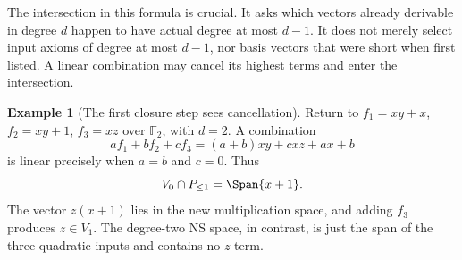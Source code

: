 \documentclass[11pt,a4paper,oneside,openany]{book}
\theoremstyle{definition}\newtheorem{definition}[theorem]{Definition}
\newtheorem{example}[theorem]{Example}
\theoremstyle{remark}\newtheorem{remark}[theorem]{Remark}
\numberwithin{equation}{chapter}
\begin{document}
The intersection in this formula is crucial. It asks which vectors
already derivable in degree $d$ happen to have actual degree at most
$d-1$. It does not merely select input axioms of degree at most $d-1$,
nor basis vectors that were short when first listed. A linear combination
may cancel its highest terms and enter the intersection.

\begin{example}[The first closure step sees cancellation]
Return to $f_1=xy+x$, $f_2=xy+1$, $f_3=xz$ over $\mathbb F_2$, with
$d=2$. A combination
\[
                   af_1+bf_2+cf_3
                  =(a+b)xy+cxz+ax+b
\]
is linear precisely when $a=b$ and $c=0$. Thus
\[
                     V_0\cap P_{\le1}=\Span\{x+1\}.
\]
The vector $z(x+1)$ lies in the new multiplication space, and adding
$f_3$ produces $z\in V_1$. The degree-two NS space, in contrast, is
just the span of the three quadratic inputs and contains no $z$ term.
\end{example}
\end{document}
